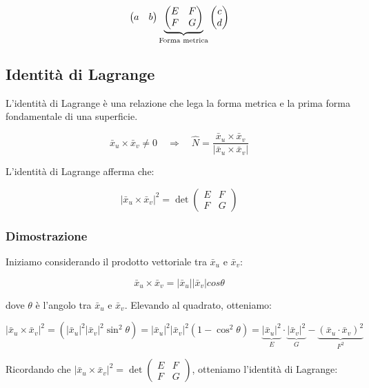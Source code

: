 $$
\begin{pmatrix}
    a & b \\
\end{pmatrix}
\underbrace{
\begin{pmatrix}
E & F \\
F & G
\end{pmatrix}
}_{\small \text{Forma metrica}}
\begin{pmatrix}
    c \\
    d
\end{pmatrix}
$$

\subsection{Identità di Lagrange}

L'identità di Lagrange è una relazione che lega la forma metrica e la prima forma fondamentale di una superficie.

$$
\bar x_u \times \bar x_v \neq 0 \quad \Rightarrow \quad \hat N = \dfrac{\bar x_u \times \bar x_v}{|\bar x_u \times \bar x_v|}
$$

L'identità di Lagrange afferma che:

$$
|\bar x_u \times \bar x_v|^2 =
\det
\begin{pmatrix}
    E & F \\
    F & G
\end{pmatrix}
$$

\subsubsection{Dimostrazione}

Iniziamo considerando il prodotto vettoriale tra $\bar x_u$ e $\bar x_v$:

$$
\bar x_u \times \bar x_v = |\bar x_u| |\bar x_v| cos \theta
$$

dove $\theta$ è l'angolo tra $\bar x_u$ e $\bar x_v$. Elevando al quadrato, otteniamo:

$$
|\bar x_u \times \bar x_v|^2 = (|\bar x_u|^2 |\bar x_v|^2 \sin^2 \theta) = |\bar x_u|^2 |\bar x_v|^2 (1 - \cos^2 \theta) = \underbrace{|\bar x_u|^2}_E \cdot \underbrace{|\bar x_v|^2}_G - \underbrace{(\bar x_u \cdot \bar x_v)^2}_{F^2}
$$

Ricordando che $|\bar x_u \times \bar x_v|^2 = \det \begin{pmatrix} E & F \\ F & G \end{pmatrix}$, otteniamo l'identità di Lagrange:


